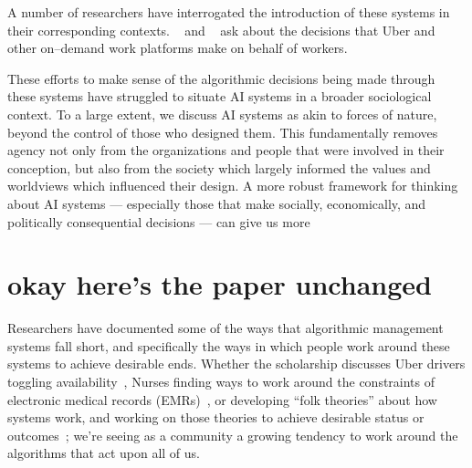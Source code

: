\documentclass[main]{subfiles}
\begin{document}
A number of researchers have interrogated the introduction of these systems in their corresponding contexts.
\citeauthor{uberAlgorithm}~\cite{uberAlgorithm} and \citeauthor{turkopticon}~\cite{turkopticon}
ask about the decisions that Uber and other on--demand work platforms make on behalf of workers.

These efforts to make sense of the algorithmic decisions being made through these systems
have struggled to situate AI systems in a broader sociological context.
To a large extent, we discuss AI systems as akin to forces of nature, beyond the control of those who designed them.
This fundamentally removes agency not only from the organizations and people that were involved in their conception,
but also from the society which largely informed the values and worldviews which influenced their design.
A more robust framework for thinking about AI systems
--- especially those that make socially, economically, and politically consequential decisions ---
can give us more 








\section*{okay here's the paper unchanged}
Researchers have documented some of the ways that algorithmic management systems fall short,
and specifically the ways in which people work around these systems to achieve desirable ends.
Whether the scholarship discusses Uber drivers toggling availability~\cite{uberAlgorithm},
Nurses finding ways to work around the constraints of electronic medical records (EMRs)~\cite{},
or developing ``folk theories'' about how systems work, and working on those theories to achieve desirable status or outcomes~\cite{};
we're seeing as a community a growing tendency to work around the algorithms that act upon all of us.
\end{document}
